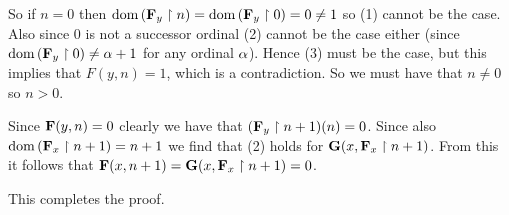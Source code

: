 {{{      So if $n=0$ then $\mathrm{dom}\,(\mathbf{F}_y \restriction n) = \mathrm{dom}\,(\mathbf{F}_y \restriction 0) = 0 \neq 1$ so (1) cannot be the case.
      Also since $0$ is not a successor ordinal (2) cannot be the case either (since $\mathrm{dom}\,(\mathbf{F}_y \restriction 0) \neq \alpha+1$ for any ordinal $\alpha$).
      Hence (3) must be the case, but this implies that $F(y,n) = 1$, which is a contradiction.
      So we must have that $n \neq 0$ so $n > 0$.

      Since $\mathbf{F}(y, n) = 0$ clearly we have that $(\mathbf{F}_y \restriction n+1)(n) = 0$.
      Since also $\mathrm{dom}\,(\mathbf{F}_x \restriction n+1) = n+1$ we find that (2) holds for $\mathbf{G}(x, \mathbf{F}_x \restriction n+1)$.
      From this it follows that $\mathbf{F}(x,n+1) = \mathbf{G}(x, \mathbf{F}_x \restriction n+1) = 0$.
    }

    This completes the proof.
  }
}
